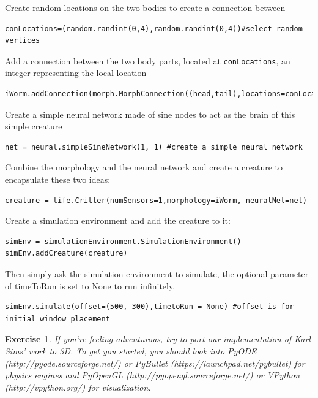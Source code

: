 \documentclass[12pt]{article}
\newtheorem{ex}{Exercise}
\begin{document}
Create random locations on the two bodies to create a connection between
\begin{verbatim}
conLocations=(random.randint(0,4),random.randint(0,4))#select random vertices
\end{verbatim}
Add a connection between the two body parts, located at \verb|conLocations|, an integer representing the local location
\begin{verbatim} 
iWorm.addConnection(morph.MorphConnection((head,tail),locations=conLocations))
\end{verbatim}
Create a simple neural network made of sine nodes to act as the brain of this simple creature
\begin{verbatim}
net = neural.simpleSineNetwork(1, 1) #create a simple neural network
\end{verbatim}
Combine the morphology and the neural network and create a creature to encapsulate these two ideas:
\begin{verbatim}
creature = life.Critter(numSensors=1,morphology=iWorm, neuralNet=net)
\end{verbatim}
Create a simulation environment and add the creature to it:
\begin{verbatim}
simEnv = simulationEnvironment.SimulationEnvironment()
simEnv.addCreature(creature)
\end{verbatim}
Then simply ask the simulation environment to simulate, the optional parameter of timeToRun is set to None to run infinitely.
\begin{verbatim}
simEnv.simulate(offset=(500,-300),timetoRun = None) #offset is for initial window placement
\end{verbatim}

\begin{ex}
If you're feeling adventurous, try to port our implementation of Karl Sims' work to 3D. To get you started, you should look into PyODE (http://pyode.sourceforge.net/) or PyBullet (https://launchpad.net/pybullet) for physics engines and PyOpenGL (http://pyopengl.sourceforge.net/) or VPython (http://vpython.org/) for visualization.
\end{ex}
\end{document}
